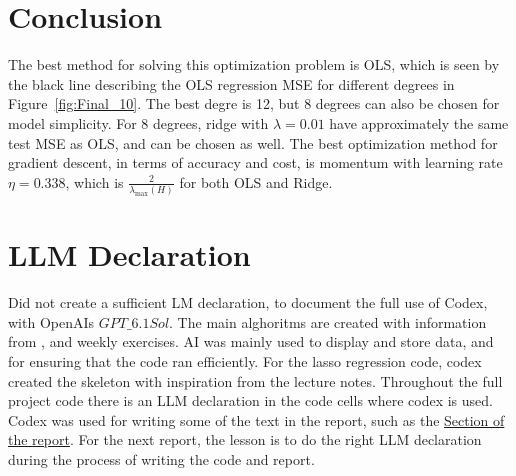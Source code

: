 \documentclass[aps,rmp,reprint,raggedbottom,amsmath,amssymb,longbibliography]{revtex4-1}
\begin{document}
\section{Conclusion}
The best method for solving this optimization problem is OLS, which is seen
by the black line describing the OLS regression MSE for different degrees in Figure~\ref{fig:Final_10}.
The best degre is 12, but 8 degrees can also be chosen for model simplicity. 
For 8 degrees, ridge with $\lambda=0.01$ have approximately the same test MSE as OLS, and 
can be chosen as well. The best optimization method for gradient descent, in terms
of accuracy and cost, is momentum with learning rate $\eta=0.338$, 
which is $\frac{2}{\lambda_{\max}(H)}$ for both OLS and Ridge.

\section{LLM Declaration}
Did not create a sufficient LM declaration, to document the full use
of Codex, with OpenAIs $GPT\_6.1 Sol$. The main alghoritms are
created with information from \cite{LectureNotes}, and weekly exercises.
AI was mainly used to display and store data, and for ensuring that 
the code ran efficiently. For the lasso regression code, codex created 
the skeleton with inspiration from the lecture notes. Throughout the full project code there is an LLM 
declaration in the code cells where codex is used.
Codex was used
for writing some of the text in the report, such as the \hyperref[subsec:Structure]{Section of the report}. 
For the next report, the lesson is to do the right LLM declaration during the 
process of writing the code and report.
 
\end{document}
